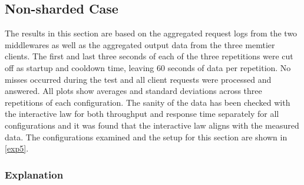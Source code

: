 \documentclass[11pt,a4paper]{article}
\begin{document}
\subsection{Non-sharded Case} \label{sec5.2}
The results in this section are based on the aggregated request logs from the two middlewares as well as the aggregated output data from the three memtier clients. The first and last three seconds of each of the three repetitions were cut off as startup and cooldown time, leaving 60 seconds of data per repetition. No misses occurred during the test and all client requests were processed and answered. All plots show averages and standard deviations across three repetitions of each configuration. The sanity of the data has been checked with the interactive law for both throughput and response time separately for all configurations and it was found that the interactive law aligns with the measured data. The configurations examined and the setup for this section are shown in \autoref{exp5}.


\subsubsection{Explanation}
\end{document}
